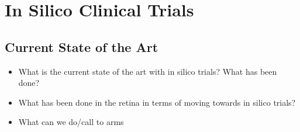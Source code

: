 \documentclass[12pt,a4paper]{article}
\begin{document}
\section {In Silico Clinical Trials}

\subsection{Current State of the Art}
\begin{itemize}
\item What is the current state of the art with in silico trials? What has been done?
\item What has been done in the retina in terms of moving towards in silico trials?
\item What can we do/call to arms
\end{itemize}


{\normalsize }
\end{document}
